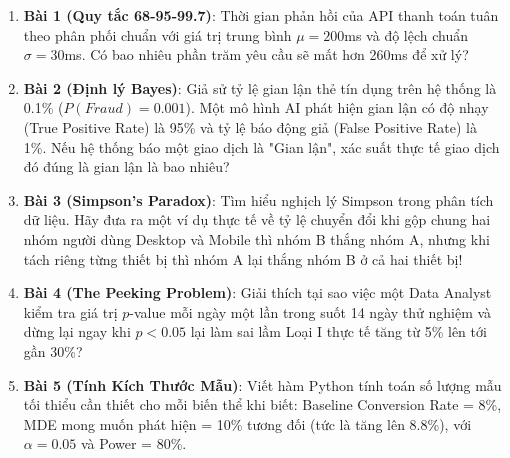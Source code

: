 \begin{baitapbox}
\begin{enumerate}
    \item \textbf{Bài 1 (Quy tắc 68-95-99.7)}: Thời gian phản hồi của API thanh toán tuân theo phân phối chuẩn với giá trị trung bình $\mu = 200$ms và độ lệch chuẩn $\sigma = 30$ms. Có bao nhiêu phần trăm yêu cầu sẽ mất hơn 260ms để xử lý?
    \item \textbf{Bài 2 (Định lý Bayes)}: Giả sử tỷ lệ gian lận thẻ tín dụng trên hệ thống là 0.1\% ($P(Fraud) = 0.001$). Một mô hình AI phát hiện gian lận có độ nhạy (True Positive Rate) là 95\% và tỷ lệ báo động giả (False Positive Rate) là 1\%. Nếu hệ thống báo một giao dịch là "Gian lận", xác suất thực tế giao dịch đó đúng là gian lận là bao nhiêu?
    \item \textbf{Bài 3 (Simpson's Paradox)}: Tìm hiểu nghịch lý Simpson trong phân tích dữ liệu. Hãy đưa ra một ví dụ thực tế về tỷ lệ chuyển đổi khi gộp chung hai nhóm người dùng Desktop và Mobile thì nhóm B thắng nhóm A, nhưng khi tách riêng từng thiết bị thì nhóm A lại thắng nhóm B ở cả hai thiết bị!
    \item \textbf{Bài 4 (The Peeking Problem)}: Giải thích tại sao việc một Data Analyst kiểm tra giá trị $p$-value mỗi ngày một lần trong suốt 14 ngày thử nghiệm và dừng lại ngay khi $p < 0.05$ lại làm sai lầm Loại I thực tế tăng từ 5\% lên tới gần 30\%?
    \item \textbf{Bài 5 (Tính Kích Thước Mẫu)}: Viết hàm Python tính toán số lượng mẫu tối thiểu cần thiết cho mỗi biến thể khi biết: Baseline Conversion Rate = 8\%, MDE mong muốn phát hiện = 10\% tương đối (tức là tăng lên 8.8\%), với $\alpha = 0.05$ và Power = 80\%.
\end{enumerate}
\end{baitapbox}

